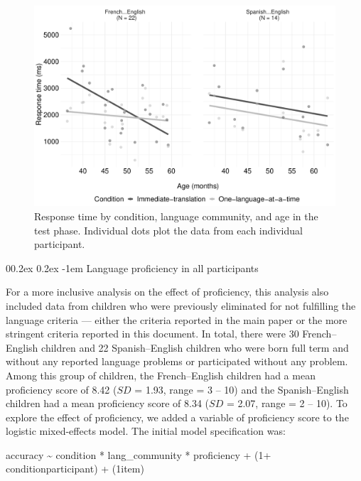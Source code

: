 \documentclass[
  man,floatsintext]{apa7}
\makeatletter
\let\oldparagraph\paragraph
\renewcommand{\paragraph}[1]{\oldparagraph{#1}\mbox{}}
\renewcommand{\paragraph}{\@startsection{paragraph}{4}{\parindent}%
  {0\baselineskip \@plus 0.2ex \@minus 0.2ex}%
  {-1em}%
  {\normalfont\normalsize\bfseries\itshape\typesectitle}}
\renewcommand{\paragraph}{\@startsection{paragraph}{4}{\parindent}%
  {0\baselineskip \@plus 0.2ex \@minus 0.2ex}%
  {-1em}%
  {\normalfont\normalsize\bfseries\typesectitle}}
\makeatother
\begin{document}
\begin{figure}

{\centering \includegraphics[width=0.9\linewidth]{TabletSwitch_supplemental_files/figure-latex/FigureS5-1} 

}

\caption{Response time by condition, language community, and age in the test phase. Individual dots plot the data from each individual participant.}\label{fig:FigureS5}
\end{figure}

\hypertarget{language-proficiency-in-all-participants}{%
\paragraph{Language proficiency in all participants}\label{language-proficiency-in-all-participants}}

For a more inclusive analysis on the effect of proficiency, this analysis also included data from children who were previously eliminated for not fulfilling the language criteria --- either the criteria reported in the main paper or the more stringent criteria reported in this document. In total, there were 30 French--English children and 22 Spanish--English children who were born full term and without any reported language problems or participated without any problem. Among this group of children, the French--English children had a mean proficiency score of 8.42 (\(SD\) = 1.93, range = 3 -- 10) and the Spanish--English children had a mean proficiency score of 8.34 (\(SD\) = 2.07, range = 2 -- 10). To explore the effect of proficiency, we added a variable of proficiency score to the logistic mixed-effects model. The initial model specification was:

accuracy \textasciitilde{} condition * lang\_community * proficiency + (1+ condition\textbar participant) + (1\textbar item)
\end{document}
